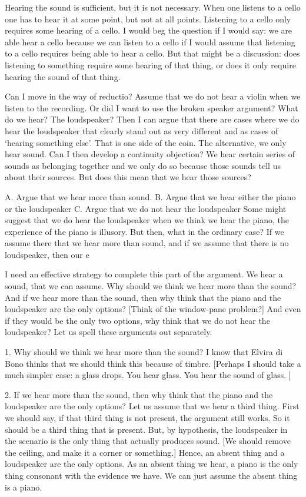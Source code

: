 \documentclass[sloppy, journal, git, bytitle, dodraft]{humapap}
\begin{document}
Hearing the sound is sufficient, but it is not necessary. When one listens to a cello one has to hear it at some point, but not at all points. Listening to a cello only requires some hearing of a cello. I would beg the question if I would say: we are able hear a cello because we can listen to a cello if I would assume that listening to a cello requires being able to hear a cello. But that might be a discussion: does listening to something require some hearing of that thing, or does it only require hearing the sound of that thing. 

Can I move in the way of reductio? Assume that we do not hear a violin when we listen to the recording. Or did I want to use the broken speaker argument? What do we hear? The loudspeaker? Then I can argue that there are cases where we do hear the loudspeaker that clearly stand out as very different and as cases of `hearing something else'. That is one side of the coin. The alternative, we only hear sound. Can I then develop a continuity objection? We hear certain series of sounds as belonging together and we only do so because those sounds tell us about their sources. But does this mean that we hear those sources? 

A. Argue that we hear more than sound.
B. Argue that we hear either the piano or the loudspeaker
C. Argue that we do not hear the loudspeaker
Some might suggest that we do hear the loudspeaker when we think we hear the piano, the experience of the piano is illusory. But then, what in the ordinary case? If we assume there that we hear more than sound, and if we assume that there is no loudspeaker, then our e

I need an effective strategy to complete this part of the argument. We hear a sound, that we can assume. Why should we think we hear more than the sound? And if we hear more than the sound, then why think that the piano and the loudspeaker are the only options? [Think of the window-pane problem?] And even if they would be the only two options, why think that we do not hear the loudspeaker? Let us spell these arguments out separately. 

1. Why should we think we hear more than the sound? I know that Elvira di Bono thinks that we should think this because of timbre. 
[Perhaps I should take a much simpler case: a glass drops. You hear glass. You hear the sound of glass. ]

2. If we hear more than the sound, then why think that the piano and the loudspeaker are the only options? Let us assume that we hear a third thing. First we should say, if that third thing is not present, the argument still works. So it should be a third thing that is present. But, by hypothesis, the loudspeaker in the scenario is the only thing that actually produces sound. [We should remove the ceiling, and make it a corner or something.] Hence, an absent thing and a loudspeaker are the only options. As an absent thing we hear, a piano is the only thing consonant with the evidence we have. We can just assume the absent thing is a piano. 
\end{document}
